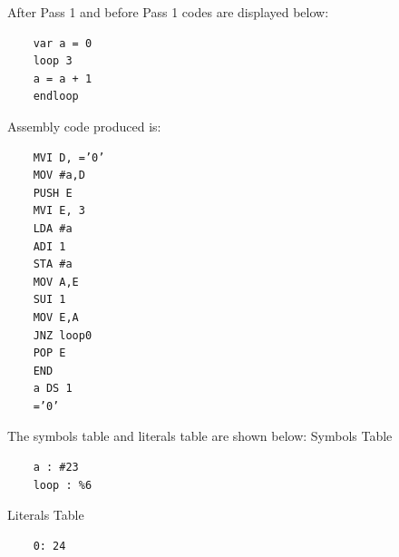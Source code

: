 \documentclass[a4paper,12pt]{extarticle}
\begin{document}
	After Pass 1 and before Pass 1 codes are displayed below:
	\begin{verbatim}
	var a = 0
	loop 3
	a = a + 1
	endloop
	\end{verbatim}
	Assembly code produced is:
		\begin{verbatim}
	MVI D, =’0’
	MOV #a,D
	PUSH E
	MVI E, 3
	LDA #a
	ADI 1
	STA #a
	MOV A,E
	SUI 1
	MOV E,A
	JNZ loop0
	POP E
	END
	a DS 1
	=’0’\end{verbatim}
	The symbols table and literals table are shown below:
	\newline
	Symbols Table
	\begin{verbatim}
	a : #23
	loop : %6
	\end{verbatim}
	Literals Table
	\begin{verbatim}
	0: 24
	\end{verbatim}
\end{document}
